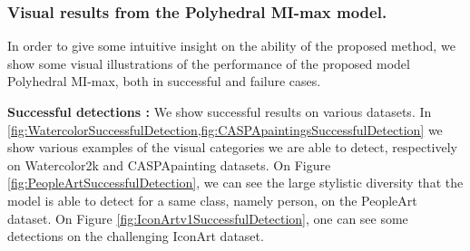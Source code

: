 \documentclass[preprint]{elsarticle}
\newcommand\MaxOfMaxS{Polyhedral MI-max}
\begin{document}
\begin{table*}[h]
\centering
\caption{Mean AP (\%) at IuO 0.5 for the common classes between the source and target sets with the \MaxOfMaxS{} model. The mean performance obtained by learning the detection on the same set (modality) is displayed between brackets.} \label{tab:PolyhedralMILS_KLtransfer}
\end{table*}


\subsubsection{Visual results from the \MaxOfMaxS{} model.}
\label{sec:visualResults}

In order to give some intuitive insight on the ability of the proposed method, we show some visual illustrations of the performance of the proposed model \MaxOfMaxS{}, both in successful and failure cases. 

{\bf Successful detections :}
We show successful results on various datasets. 
In \cref{fig:WatercolorSuccessfulDetection,fig:CASPApaintingsSuccessfulDetection} we show various examples of the visual categories we are able to detect, respectively on Watercolor2k and CASPApainting datasets. On Figure \ref{fig:PeopleArtSuccessfulDetection}, we can see the large stylistic diversity that the model is able to detect for a same class, namely person, on the PeopleArt dataset.
On Figure \ref{fig:IconArtv1SuccessfulDetection}, one can see some detections on the challenging IconArt dataset.
\end{document}
